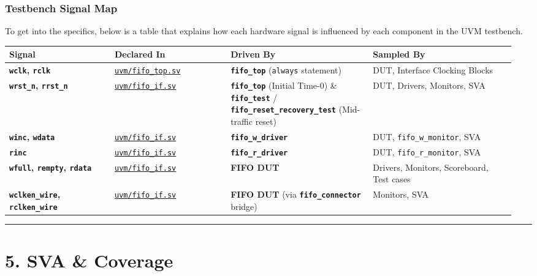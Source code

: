 \documentclass[
]{article}
\newcounter{none} %
\begin{document}
\subsubsection{Testbench Signal Map}\label{testbench-signal-map}

To get into the specifics, below is a table that explains how each
hardware signal is influenced by each component in the UVM testbench.

{\def\LTcaptype{none} %
\begin{longtable}[]{@{}p{0.20\linewidth}p{0.22\linewidth}p{0.27\linewidth}p{0.27\linewidth}@{}}
\toprule\noalign{}
Signal & Declared In & Driven By & Sampled By \\
\midrule\noalign{}
\endhead
\bottomrule\noalign{}
\endlastfoot
\textbf{\texttt{wclk}, \texttt{rclk}} &
\href{uvm/fifo_top.sv}{\texttt{uvm/fifo\_top.sv}} &
\textbf{\texttt{fifo\_top}} (\texttt{always} statement) & DUT, Interface
Clocking Blocks \\
\textbf{\texttt{wrst\_n}, \texttt{rrst\_n}} &
\href{uvm/fifo_if.sv}{\texttt{uvm/fifo\_if.sv}} &
\textbf{\texttt{fifo\_top}} (Initial Time-0) \&
\textbf{\texttt{fifo\_test}} /
\textbf{\texttt{fifo\_reset\_recovery\_test}} (Mid-traffic reset) & DUT,
Drivers, Monitors, SVA \\
\textbf{\texttt{winc}, \texttt{wdata}} &
\href{uvm/fifo_if.sv}{\texttt{uvm/fifo\_if.sv}} &
\textbf{\texttt{fifo\_w\_driver}} & DUT, \texttt{fifo\_w\_monitor},
SVA \\
\textbf{\texttt{rinc}} & \href{uvm/fifo_if.sv}{\texttt{uvm/fifo\_if.sv}}
& \textbf{\texttt{fifo\_r\_driver}} & DUT, \texttt{fifo\_r\_monitor},
SVA \\
\textbf{\texttt{wfull}, \texttt{rempty}, \texttt{rdata}} &
\href{uvm/fifo_if.sv}{\texttt{uvm/fifo\_if.sv}} & \textbf{FIFO DUT} &
Drivers, Monitors, Scoreboard, Test cases \\
\textbf{\texttt{wclken\_wire}, \texttt{rclken\_wire}} &
\href{uvm/fifo_if.sv}{\texttt{uvm/fifo\_if.sv}} & \textbf{FIFO DUT} (via
\textbf{\texttt{fifo\_connector}} bridge) & Monitors, SVA \\
\end{longtable}
}

\begin{center}\rule{0.5\linewidth}{0.5pt}\end{center}

\section{5. SVA \& Coverage}\label{5-sva--coverage}
\end{document}

